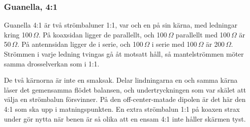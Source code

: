\subsubsection{Guanella, 4:1}
\label{sec:guanella-41}

Guanella 4:1 är två strömbaluner 1:1, var och en på sin kärna, med
ledningar kring 100\,$\Omega$. På koaxsidan ligger de parallellt, och
100\,$\Omega$ parallellt med 100\,$\Omega$ är 50\,$\Omega$. På
antennsidan ligger de i serie, och 100\,$\Omega$ i serie med 100\,$\Omega$
är 200\,$\Omega$. Strömmen i varje ledning tvingas gå åt motsatt håll,
så mantelströmmen möter samma drosselverkan som i 1:1.

De två kärnorna är inte en smaksak. Delar lindningarna en och samma
kärna låser det gemensamma flödet balansen, och undertryckningen som var
skälet att välja en strömbalun försvinner. På den off-center-matade
dipolen är det här den 4:1 som ska upp i matningspunkten. En extra
strömbalun 1:1 på koaxen strax under gör nytta när benen är så olika att
en ensam 4:1 inte håller skärmen tyst.

